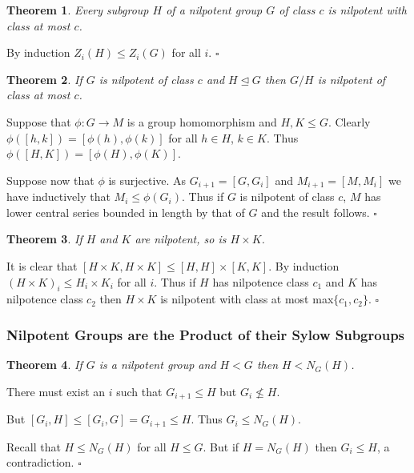 \documentclass[10pt]{article}
\newtheorem{theorem}{Theorem}[section]
\newenvironment{proof}[1][Proof]{\begin{trivlist}
\item[\hskip \labelsep {\itshape #1}]}{\end{trivlist}}
\begin{document}
\begin{theorem}
Every subgroup $H$ of a nilpotent group $G$ of class $c$ is nilpotent with class at most $c$.
\end{theorem}

\begin{proof}
By induction $Z_i(H) \leq Z_i(G)$ for all $i$. $\square$
\end{proof}

\begin{theorem}
If $G$ is nilpotent of class $c$ and $H \mathrel{\unlhd} G$ then $G/H$ is nilpotent of class at most $c$.
\end{theorem}

\begin{proof}
Suppose that $\phi: G \to M$ is a group homomorphism and $H, K \leq G$. Clearly $\phi([h, k]) = [\phi(h), \phi(k)]$ for all $h \in H$, $k \in K$. Thus $\phi([H, K]) = [\phi(H), \phi(K)]$.

Suppose now that $\phi$ is surjective. As $G_{i+1} = [G, G_i]$ and $M_{i+1} = [M, M_i]$ we have inductively that $M_i \leq \phi(G_i)$. Thus if $G$ is nilpotent of class $c$, $M$ has lower central series bounded in length by that of $G$ and the result follows. $\square$
\end{proof}

\begin{theorem}
If $H$ and $K$ are nilpotent, so is $H\times K$.
\end{theorem}

\begin{proof}
It is clear that $[H\times K, H\times K] \leq [H, H]\times [K, K]$. By induction $(H\times K)_i \leq H_i\times K_i$ for all $i$. Thus if $H$ has nilpotence class $c_1$ and $K$ has nilpotence class $c_2$ then $H\times K$ is nilpotent with class at most max$\{c_1, c_2\}$. $\square$
\end{proof}

\subsubsection{Nilpotent Groups are the Product of their Sylow Subgroups}

\begin{theorem} \label{normalizercond}
If $G$ is a nilpotent group and $H < G$ then $H < N_G(H)$.
\end{theorem}

\begin{proof}
There must exist an $i$ such that $G_{i+1} \leq H$ but $G_i \not\leq H$.

But $[G_i, H] \leq [G_i, G] = G_{i+1} \leq H$. Thus $G_i \leq N_G(H)$. 

Recall that $H \leq N_G(H)$ for all $H \leq G$. But if $H = N_G(H)$ then $G_i \leq H$, a contradiction. $\square$
\end{proof}
\end{document}

